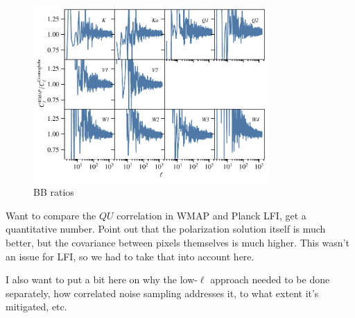 \documentclass[twocolumn]{../../common/aa}
\begin{document}
\begin{figure}
	\centering
	\includegraphics[width=0.8\textwidth]{figures/BB_spectra_ratio.pdf}
	\caption{BB ratios}
\end{figure}






Want to compare the $QU$ correlation in WMAP and Planck LFI, get a quantitative number. Point out that the polarization solution itself is much better, but the covariance between pixels themselves is much higher. This wasn't an issue for LFI, so we had to take that into account here.

I also want to put a bit here on why the low-$\ell$ approach needed to be done separately, how correlated noise sampling addresses it, to what extent it's mitigated, etc.
\end{document}
